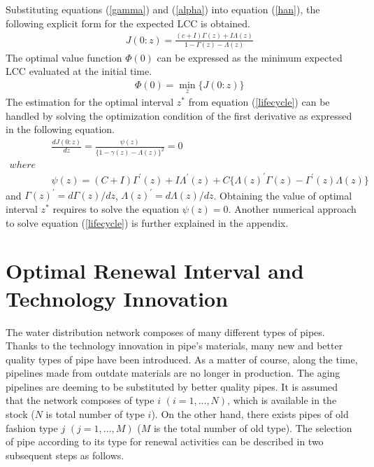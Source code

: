 \documentclass[a4paper,oneside,onecolumn,preprint,10pt,authoryear]{elsarticle}
\begin{document}
Substituting equations (\ref{gamma}) and (\ref{alpha}) into equation (\ref{han}), the following explicit form for the expected LCC is obtained.
\begin{eqnarray}
&& J(0:z)= \frac{(c+I)\Gamma(z)+I \Lambda(z)}{1-\Gamma(z)-\Lambda(z)} \label{lifecycle}
\end{eqnarray}
The optimal value function $\Phi(0)$ can be expressed as the minimum expected LCC evaluated at the initial time. 
\begin{eqnarray}
&& \Phi(0)=\min_{z}\{ J(0:z) \}\label{imp}
\end{eqnarray}
The estimation for the optimal interval $z^*$ from equation (\ref{lifecycle}) can be handled by solving the optimization condition of the first derivative as expressed in the following equation.
\begin{eqnarray}
&& \frac{dJ(0:z)}{dz}=\frac{ \psi(z)}{\{1-\gamma(z)-\Lambda(z)\}^2 }=0 \\
where\nonumber \\
&& \psi(z)=(C+I)\Gamma^\prime(z)+I\Lambda^\prime(z)+C\{\Lambda(z)^\prime\Gamma(z)
 -\Gamma^\prime(z)\Lambda(z)\}
\end{eqnarray}
and $\Gamma(z)^\prime=d\Gamma(z)/dz$, $\Lambda(z) ^\prime=d\Lambda(z)/dz$. Obtaining the value of optimal interval $z^*$ requires to solve the equation $\psi(z)=0$. Another numerical approach to solve equation (\ref{lifecycle}) is further explained in the appendix.
\section{Optimal Renewal Interval and Technology Innovation}
\label{57}
The water distribution network composes of many different types of pipes. Thanks to the technology innovation in pipe's materials, many new and better quality types of pipe have been introduced. As a matter of course, along the time, pipelines made from outdate materials are no longer in production. The aging pipelines are deeming to be substituted by better quality pipes. It is assumed that the network composes of type $i$ $(i=1,...,N)$, which is available in the stock ($N$ is total number of type $i$). On the other hand, there exists pipes of old fashion type $j$ $(j=1,...,M)$ ($M$ is the total number of old type). The selection of pipe according to its type for renewal activities can be described in two subsequent steps as follows.
\end{document}
